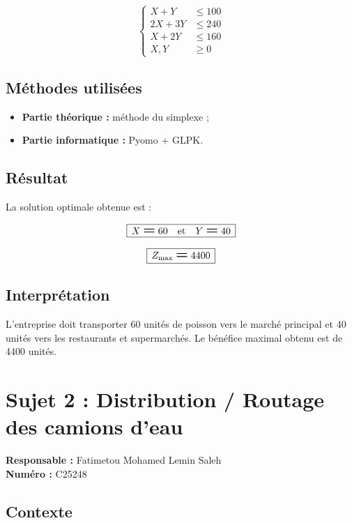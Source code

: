 \documentclass[12pt,a4paper]{article}
\newcommand{\Eq}{\mathrel{\text{\Large\bfseries =}}}
\newcommand{\Leq}{\leqslant}
\newcommand{\Geq}{\geqslant}
\newcommand{\BoxedEq}[1]{%
  \begin{equation*}
    \boxed{\,\displaystyle #1\,}
  \end{equation*}%
}
\begin{document}
\[
\left\{
\begin{aligned}
X + Y    &\Leq 100 \\
2X + 3Y  &\Leq 240 \\
X + 2Y   &\Leq 160 \\
X, Y     &\Geq 0
\end{aligned}
\right.
\]

\subsection{Méthodes utilisées}
\begin{itemize}
    \item \textbf{Partie théorique :} méthode du simplexe ;
    \item \textbf{Partie informatique :} Pyomo + GLPK.
\end{itemize}

\subsection{Résultat}

La solution optimale obtenue est :

\BoxedEq{X \Eq 60 \quad\text{et}\quad Y \Eq 40}

\BoxedEq{Z_{\mathrm{max}} \Eq 4400}

\subsection{Interprétation}

L'entreprise doit transporter 60 unités de poisson vers le marché principal et 40 unités vers les restaurants et supermarchés. Le bénéfice maximal obtenu est de 4400 unités.

\section{Sujet 2 : Distribution / Routage des camions d'eau}

\begin{responsable}
\textbf{Responsable :} Fatimetou Mohamed Lemin Saleh \\
\textbf{Numéro :} C25248
\end{responsable}

\subsection{Contexte}
\end{document}
